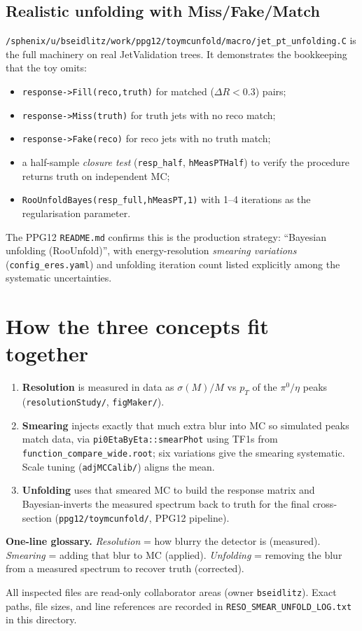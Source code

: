 \documentclass[11pt]{article}
\newcommand{\pp}[1]{\textcolor{pathcol}{\texttt{#1}}}
\begin{document}
\subsection{Realistic unfolding with Miss/Fake/Match}
\pp{/sphenix/u/bseidlitz/work/ppg12/toymcunfold/macro/jet\_pt\_unfolding.C}
is the full machinery on real JetValidation trees. It demonstrates the
bookkeeping that the toy omits:
\begin{itemize}[nosep]
  \item \texttt{response->Fill(reco,truth)} for matched ($\Delta R<0.3$) pairs;
  \item \texttt{response->Miss(truth)} for truth jets with no reco match;
  \item \texttt{response->Fake(reco)} for reco jets with no truth match;
  \item a half-sample \emph{closure test} (\texttt{resp\_half},
        \texttt{hMeasPTHalf}) to verify the procedure returns truth on
        independent MC;
  \item \texttt{RooUnfoldBayes(resp\_full,hMeasPT,1)} with 1--4 iterations as
        the regularisation parameter.
\end{itemize}
The PPG12 \texttt{README.md} confirms this is the production strategy:
``Bayesian unfolding (RooUnfold)'', with energy-resolution \emph{smearing
variations} (\texttt{config\_eres.yaml}) and unfolding iteration count listed
explicitly among the systematic uncertainties.

\section{How the three concepts fit together}
\begin{enumerate}[nosep]
  \item \textbf{Resolution} is measured in data as $\sigma(M)/M$ vs $p_T$ of the
        $\pi^0/\eta$ peaks (\texttt{resolutionStudy/}, \texttt{figMaker/}).
  \item \textbf{Smearing} injects exactly that much extra blur into MC so
        simulated peaks match data, via \texttt{pi0EtaByEta::smearPhot} using
        TF1s from \texttt{function\_compare\_wide.root}; six variations give the
        smearing systematic. Scale tuning (\texttt{adjMCCalib/}) aligns the mean.
  \item \textbf{Unfolding} uses that smeared MC to build the response matrix and
        Bayesian-inverts the measured spectrum back to truth for the final
        cross-section (\texttt{ppg12/toymcunfold/}, PPG12 pipeline).
\end{enumerate}

\noindent\textbf{One-line glossary.}
\emph{Resolution} = how blurry the detector is (measured).
\emph{Smearing} = adding that blur to MC (applied).
\emph{Unfolding} = removing the blur from a measured spectrum to recover truth
(corrected).

\bigskip
\noindent\footnotesize All inspected files are read-only collaborator areas
(owner \texttt{bseidlitz}). Exact paths, file sizes, and line references are
recorded in \texttt{RESO\_SMEAR\_UNFOLD\_LOG.txt} in this directory.
\end{document}
